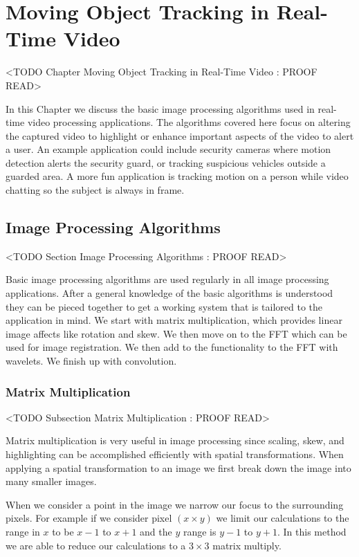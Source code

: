 \chapter{Moving Object Tracking in Real-Time Video}
	<TODO Chapter Moving Object Tracking in Real-Time Video : PROOF READ>

In this Chapter we discuss the basic image processing algorithms used in real-time video processing applications. The algorithms covered here focus on altering the captured video to highlight or enhance important aspects of the video to alert a user. An example application could include security cameras where motion detection alerts the security guard, or tracking suspicious vehicles outside a guarded area. A more fun application is tracking motion on a person while video chatting so the subject is always in frame. 

	
\section{Image Processing Algorithms}
	<TODO Section Image Processing Algorithms : PROOF READ>

Basic image processing algorithms are used regularly in all image processing applications. After a general knowledge of the basic algorithms is understood they can be pieced together to get a working system that is tailored to the application in mind. We start with matrix multiplication, which provides linear image affects like rotation and skew. We then move on to the \ac{FFT} which can be used for image registration. We then add to the functionality to the \ac{FFT} with wavelets. We finish up with convolution.

	
\subsection{Matrix Multiplication}
	<TODO Subsection Matrix Multiplication : PROOF READ>

Matrix multiplication is very useful in image processing since scaling, skew, and highlighting can be accomplished efficiently with spatial transformations. When applying a spatial transformation to an image we first break down the image into many smaller images. 

When we consider a point in the image we narrow our focus to the surrounding pixels. For example if we consider pixel $(x\times y)$ we limit our calculations to the range in $x$ to be $x-1$ to $x+1$ and the $y$ range is $y-1$ to $y+1$. In this method we are able to reduce our calculations to a $3 \times 3$ matrix multiply. 

